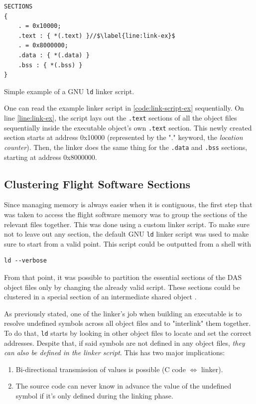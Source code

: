 {\begin{listing}[H]
	\vspace{12pt}
	\begin{verbatim}
SECTIONS
{
	. = 0x10000;
	.text : { *(.text) }//$\label{line:link-ex}$
	. = 0x8000000;
	.data : { *(.data) }
	.bss : { *(.bss) }
}
	\end{verbatim}
	\caption{Simple example of a GNU \texttt{ld} linker script.}
	\label{code:link-script-ex}
\end{listing}

One can read the example linker script in \autoref{code:link-script-ex}  sequentially. On line \ref{line:link-ex}, the script lays out the \texttt{.text} sections of all the object files sequentially inside the executable object's own \texttt{.text} section. This newly created section starts at address 0x10000 (represented by the "." keyword, the \textit{location counter}\cite{online:gnu-ld}). Then, the linker does the same thing for the \texttt{.data} and \texttt{.bss} sections, starting at address 0x8000000.

\subsection*{Clustering Flight Software Sections}
Since managing memory is always easier when it is contiguous, the first step that was taken to access the flight software memory was to group the sections of the relevant files together. This was done using a custom linker script. To make sure not to leave out any section, the default GNU \texttt{ld} linker script was used to make sure to start from a valid point. This script could be outputted from a shell with 
\begin{verbatim}
ld --verbose
\end{verbatim}
From that point, it was possible to partition the essential sections of the DAS object files only by changing the already valid script. These sections could be clustered in a special section of an intermediate shared object . 

As previously stated, one of the linker's job when building an executable is to resolve undefined symbols across all object files and to "interlink" them together. To do that, \texttt{ld} starts by looking in other object files to locate and set the correct addresses. Despite that, if said symbols are not defined in any object files, \textit{they can also be defined in the linker script}. This has two major implications: 
\begin{enumerate}
	\item Bi-directional transmission of values is possible (C code $\Longleftrightarrow$ linker).
	\item The source code can never know in advance the value of the undefined symbol if it's only defined during the linking phase.
\end{enumerate}

}
